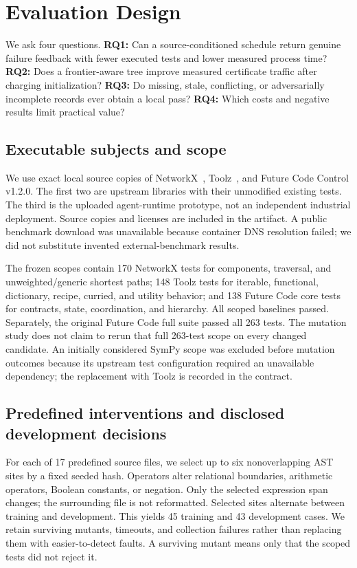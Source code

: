 \section{Evaluation Design}\label{sec:evaluation}
We ask four questions. \textbf{RQ1:} Can a source-conditioned schedule return genuine failure feedback with fewer executed tests and lower measured process time? \textbf{RQ2:} Does a frontier-aware tree improve measured certificate traffic after charging initialization? \textbf{RQ3:} Do missing, stale, conflicting, or adversarially incomplete records ever obtain a local pass? \textbf{RQ4:} Which costs and negative results limit practical value?

\subsection{Executable subjects and scope}
We use exact local source copies of NetworkX~\cite{networkx}, Toolz~\cite{toolz}, and Future Code Control v1.2.0. The first two are upstream libraries with their unmodified existing tests. The third is the uploaded agent-runtime prototype, not an independent industrial deployment. Source copies and licenses are included in the artifact. A public benchmark download was unavailable because container DNS resolution failed; we did not substitute invented external-benchmark results.

The frozen scopes contain 170 NetworkX tests for components, traversal, and unweighted/generic shortest paths; 148 Toolz tests for iterable, functional, dictionary, recipe, curried, and utility behavior; and 138 Future Code core tests for contracts, state, coordination, and hierarchy. All scoped baselines passed. Separately, the original Future Code full suite passed all 263 tests. The mutation study does not claim to rerun that full 263-test scope on every changed candidate. An initially considered SymPy scope was excluded before mutation outcomes because its upstream test configuration required an unavailable dependency; the replacement with Toolz is recorded in the contract.



\subsection{Predefined interventions and disclosed development decisions}
For each of 17 predefined source files, we select up to six nonoverlapping AST sites by a fixed seeded hash. Operators alter relational boundaries, arithmetic operators, Boolean constants, or negation. Only the selected expression span changes; the surrounding file is not reformatted. Selected sites alternate between training and development. This yields 45 training and 43 development cases. We retain surviving mutants, timeouts, and collection failures rather than replacing them with easier-to-detect faults. A surviving mutant means only that the scoped tests did not reject it.

